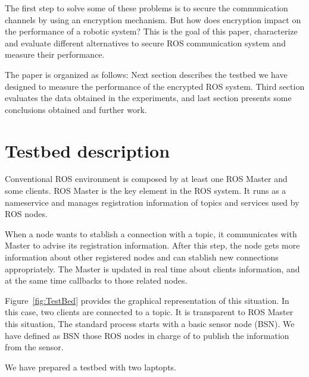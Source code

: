 \documentclass[journal,twoside]{JoPhA}
\begin{document}
The first step to solve some of these problems is to secure the communication channels by using an encryption mechanism. But how does encryption impact on the performance of a robotic system? This is the goal of this paper, characterize and evaluate different alternatives to secure ROS communication system and measure their performance.


The paper is organized as follows: Next section describes the testbed we have designed to measure the performance of the encrypted ROS system. Third section evaluates the data obtained in the experiments, and last section presents some conclusions obtained and further work.



\section{Testbed description}

Conventional ROS environment is composed by at least one ROS Master and some clients. ROS Master is the key element in the ROS system. It runs as a nameservice and manages registration information of topics and services used by ROS nodes. 

When a node wants to stablish a connection with a topic, it communicates with Master to advise its registration information. After this step, the node gets more information about other registered nodes and can stablish new connections appropriately. The Master is updated in real time about clients information, and at the same time callbacks to those related nodes.


Figure~\ref{fig:TestBed} provides the graphical representation of this situation. In this case, two clients are connected to a topic. It is transparent to ROS Master this situation,  
The standard process starts with a basic sensor node (BSN). We have defined as BSN those ROS nodes in charge of to publish the information from the sensor.



We have prepared a testbed with two laptopts.
\end{document}
